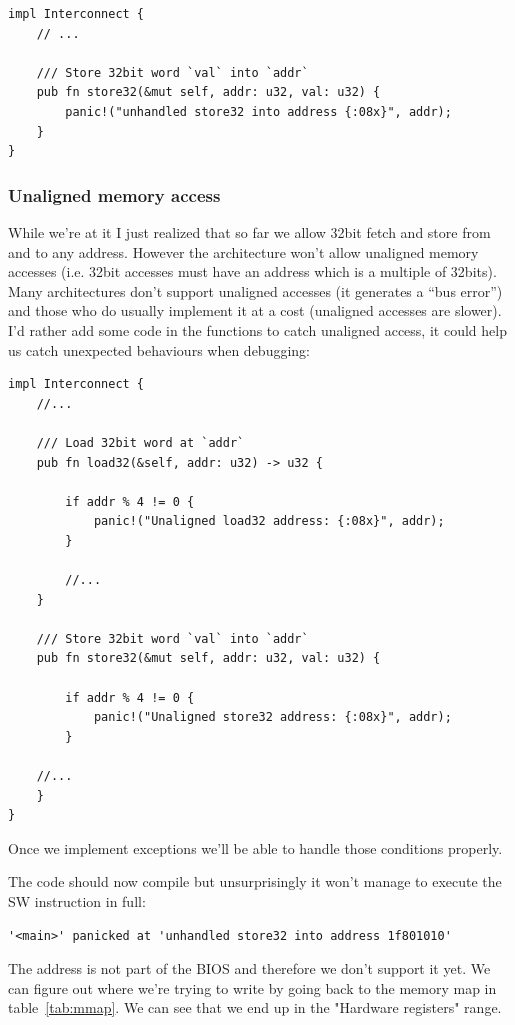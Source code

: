 \documentclass[a4paper]{article}
\begin{document}
\begin{lstlisting}
impl Interconnect {
    // ...

    /// Store 32bit word `val` into `addr`
    pub fn store32(&mut self, addr: u32, val: u32) {
        panic!("unhandled store32 into address {:08x}", addr);
    }
}
\end{lstlisting}

\subsubsection{Unaligned memory access}

While we're at it I just realized that so far we allow 32bit fetch and
store from and to any address. However the architecture won't allow
unaligned memory accesses (i.e. 32bit accesses must have an address
which is a multiple of 32bits). Many architectures don't support
unaligned accesses (it generates a ``bus error'') and those who do
usually implement it at a cost (unaligned accesses are slower). I'd
rather add some code in the functions to catch unaligned access, it
could help us catch unexpected behaviours when debugging:

\begin{lstlisting}
impl Interconnect {
    //...

    /// Load 32bit word at `addr`
    pub fn load32(&self, addr: u32) -> u32 {

        if addr % 4 != 0 {
            panic!("Unaligned load32 address: {:08x}", addr);
        }

        //...
    }

    /// Store 32bit word `val` into `addr`
    pub fn store32(&mut self, addr: u32, val: u32) {

        if addr % 4 != 0 {
            panic!("Unaligned store32 address: {:08x}", addr);
        }

	//...
    }
}
\end{lstlisting}

Once we implement exceptions we'll be able to handle those conditions
properly.

The code should now compile but unsurprisingly it won't manage to
execute the SW instruction in full:

\begin{verbatim}
'<main>' panicked at 'unhandled store32 into address 1f801010'
\end{verbatim}

The address is not part of the BIOS and therefore we don't support it
yet. We can figure out where we're trying to write by going back to
the memory map in table~\ref{tab:mmap}. We can see that we end up in
the "Hardware registers" range.
\end{document}
